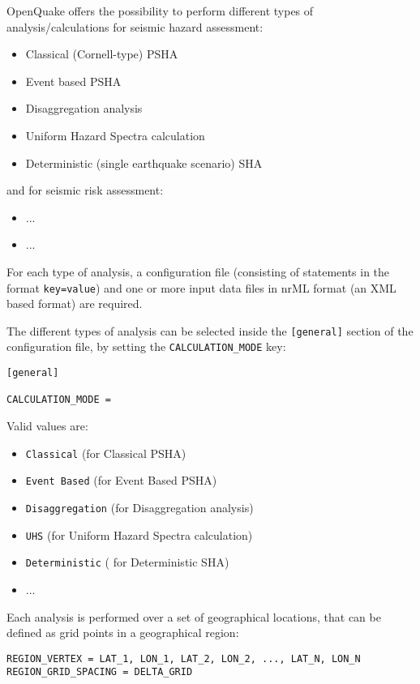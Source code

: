 OpenQuake offers the possibility to perform different types of analysis/calculations for seismic hazard assessment:
\begin{itemize}
\item Classical (Cornell-type) PSHA
\item Event based PSHA
\item Disaggregation analysis
\item Uniform Hazard Spectra calculation
\item Deterministic (single earthquake scenario) SHA
\end{itemize}

and for seismic risk assessment:
\begin{itemize}
\item ...
\item ...
\end{itemize}

For each type of analysis, a configuration file (consisting of statements in the format \Verb+key=value+) and one or more input data files in nrML format (an XML based format) are required.

The different types of analysis can be selected inside the \Verb+[general]+ section of the configuration file, by setting  the \Verb+CALCULATION_MODE+ key:
\begin{Verbatim}[frame=single]
[general]

CALCULATION_MODE =
\end{Verbatim}

Valid values are: 
\begin{itemize}
\item \Verb+Classical+ (for Classical PSHA)
\item \Verb+Event Based+ (for Event Based PSHA)
\item \Verb+Disaggregation+ (for Disaggregation analysis)
\item \Verb+UHS+ (for Uniform Hazard Spectra calculation)
\item \Verb+Deterministic+ ( for Deterministic SHA)
\item ...
\end{itemize}

Each analysis is performed over a set of geographical locations, that can be defined as grid points in a geographical region:

\begin{Verbatim}[frame=single]
REGION_VERTEX = LAT_1, LON_1, LAT_2, LON_2, ..., LAT_N, LON_N
REGION_GRID_SPACING = DELTA_GRID
\end{Verbatim}

